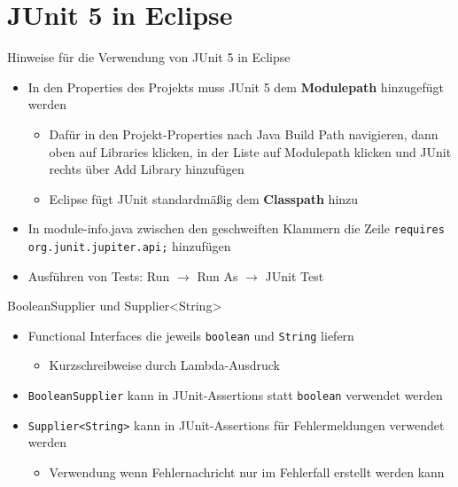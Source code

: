 \documentclass[utf8,t,aspectratio=169]{beamer}
\begin{document}
  \section{JUnit 5 in Eclipse}
    \begin{frame}[fragile]{Hinweise für die Verwendung von JUnit 5 in Eclipse}
      \begin{itemize}
        \item In den Properties des Projekts muss JUnit 5 dem \textbf{Modulepath} hinzugefügt werden
          \begin{itemize}
            \item Dafür in den Projekt-Properties nach \glqq{}Java Build Path\grqq{} navigieren, dann oben auf \glqq{}Libraries\grqq{} klicken, in der Liste auf \glqq{}Modulepath\grqq{} klicken und JUnit rechts über \glqq{}Add Library\grqq{} hinzufügen
            \item Eclipse fügt JUnit standardmäßig dem \textbf{Classpath} hinzu
          \end{itemize}
        \item In module-info.java zwischen den geschweiften Klammern die Zeile \lstinline{requires org.junit.jupiter.api;} hinzufügen
        \item Ausführen von Tests: Run $\rightarrow$ Run As $\rightarrow$ JUnit Test
      \end{itemize}
    \end{frame}
    \begin{frame}[fragile]{BooleanSupplier und Supplier<String>}
      \begin{itemize}
        \item Functional Interfaces die jeweils \lstinline{boolean} und \lstinline{String} liefern
          \begin{itemize}
            \item Kurzschreibweise durch Lambda-Ausdruck
          \end{itemize}
        \item \lstinline{BooleanSupplier} kann in JUnit-Assertions statt \lstinline{boolean} verwendet werden
        \item \lstinline{Supplier<String>} kann in JUnit-Assertions für Fehlermeldungen verwendet werden
          \begin{itemize}
            \item Verwendung wenn Fehlernachricht nur im Fehlerfall erstellt werden kann
          \end{itemize}
      \end{itemize}
    \end{frame}
\end{document}
